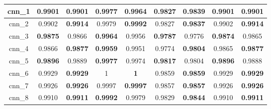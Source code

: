 \begin{table}[p]
\begin{tabular} {|c|c|c|c|c|c|c|c|c| }
        cnn\_1   & 0.9901                        & \textbf{0.9901}                     & \textbf{0.9977}                & 0.9964                         & 0.9827                     & \textbf{0.9839}                     & 0.9901                     & \textbf{0.9901}                     \\ \hline
        cnn\_2   & 0.9902                        & \textbf{0.9914}                     & 0.9979                         & \textbf{0.9992}                & 0.9827                     & \textbf{0.9837}                     & 0.9902                     & \textbf{0.9914}                     \\ \hline
        cnn\_3   & \textbf{0.9875}               & 0.9866                              & \textbf{0.9964}                & 0.9956                         & \textbf{0.9787}            & 0.9776                              & \textbf{0.9874}            & 0.9865                              \\ \hline
        cnn\_4   & 0.9866                        & \textbf{0.9877}                     & \textbf{0.9959}                & 0.9951                         & 0.9774                     & \textbf{0.9804}                     & 0.9865                     & \textbf{0.9877}                     \\ \hline
        cnn\_5   & \textbf{0.9896}               & 0.9889                              & \textbf{0.9977}                & 0.9974                         & \textbf{0.9817}            & 0.9804                              & \textbf{0.9896}            & 0.9888                              \\ \hline
        cnn\_6   & \cellcolor{green!50}0.9929    & \textbf{\cellcolor{green!50}0.9929} & \cellcolor{green!50}1          & \textbf{\cellcolor{green!50}1} & 0.9859                     & \textbf{0.9859}                     & \cellcolor{green!50}0.9929 & \textbf{\cellcolor{green!50}0.9929} \\ \hline
        cnn\_7   & 0.9926                        & \textbf{0.9926}                     & 0.9997                         & \textbf{0.9997}                & 0.9857                     & \textbf{0.9857}                     & 0.9926                     & \textbf{0.9926}                     \\ \hline
        cnn\_8   & 0.9910                        & \textbf{0.9911}                     & \textbf{0.9992}                & 0.9979                         & 0.9829                     & \textbf{0.9844}                     & 0.9910                     & \textbf{0.9911}                     \\ \hline

\end{tabular}
\end{table}
